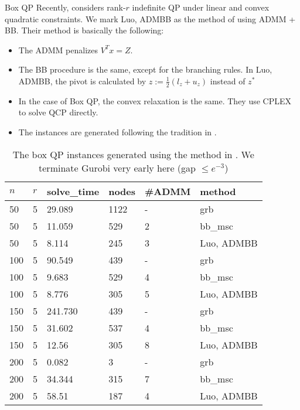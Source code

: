 \documentclass[aspectratio=1610, 9pt]{beamer}
\begin{document}
\begin{frame}[allowframebreaks]{Box QP}
  Recently, \cite{luo_new_2019} considers rank-\(r\) indefinite QP under linear and convex quadratic constraints. We mark \textsf{Luo, ADMBB} as the method of using ADMM + BB.  Their method is basically the following:
  \begin{itemize}
    \item The ADMM penalizes \(V^Tx = Z\).
    \item The BB procedure is the same, except for the branching rules. In \textsf{Luo, ADMBB}, the pivot is calculated by \(z := \frac{1}{2}(l_z + u_z)\) instead of \(z^*\)
    \item In the case of Box QP, the convex relaxation is the same. They use CPLEX to solve QCP directly.
    \item The instances are generated following the tradition in \cite{le_an_solving_1997}.
  \end{itemize}

  \framebreak
  \small
  \begin{table}[h!]
    \centering
    \begin{tabular}{llllll}
      \toprule
      \(n\) & \(r\) & solve\_time & nodes & \#ADMM & method              \\
      \midrule
      50    & 5     & 29.089      & 1122  & -      & grb                 \\
      50    & 5     & 11.059      & 529   & 2      & bb\_msc             \\
      50    & 5     & 8.114       & 245   & 3      & \textsf{Luo, ADMBB} \\
      100   & 5     & 90.549      & 439   & -      & grb                 \\
      100   & 5     & 9.683       & 529   & 4      & bb\_msc             \\
      100   & 5     & 8.776       & 305   & 5      & \textsf{Luo, ADMBB} \\
      150   & 5     & 241.730     & 439   & -      & grb                 \\
      150   & 5     & 31.602      & 537   & 4      & bb\_msc             \\
      150   & 5     & 12.56       & 305   & 8      & \textsf{Luo, ADMBB} \\
      200   & 5     & 0.082       & 3     & -      & grb                 \\
      200   & 5     & 34.344      & 315   & 7      & bb\_msc             \\
      200   & 5     & 58.51       & 187   & 4      & \textsf{Luo, ADMBB} \\
      \bottomrule
    \end{tabular}
    \caption{The box QP instances generated using the method in \cite{luo_new_2019}.
      We terminate Gurobi very early here (gap \(\le e^{-3}\))}


\end{table}
\end{frame}
\end{document}
